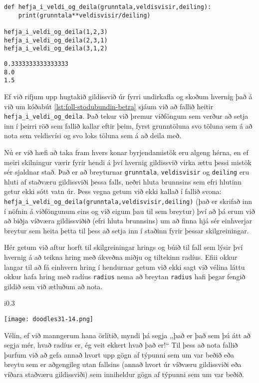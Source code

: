 \begin{lstlisting}[caption=Stöðubundin viðföng með skýrari breytuheitum, label=lst:foll-stodubundin-betra]
def hefja_i_veldi_og_deila(grunntala,veldisvisir,deiling):	
	print(grunntala**veldisvisir/deiling)

hefja_i_veldi_og_deila(1,2,3)
hefja_i_veldi_og_deila(2,3,1)
hefja_i_veldi_og_deila(3,1,2)
\end{lstlisting}
\lstset{style=uttak}
\begin{lstlisting}
0.3333333333333333
8.0
1.5
\end{lstlisting}
\lstset{style=venjulegt}

Ef við rifjum upp hugtakið gildissvið úr fyrri undirkafla og skoðum hvernig það á við um kóðabút \ref{lst:foll-stodubundin-betra} sjáum við að fallið heitir \texttt{hefja\_i\_veldi\_og\_deila}.
Það tekur við þremur viðföngum sem verður að setja inn í þeirri röð sem fallið kallar eftir þeim, fyrst grunntöluna svo töluna sem á að nota sem veldisvísi og svo loks töluna sem á að deila með.

Nú er við hæfi að taka fram hvers konar byrjendamistök eru algeng hérna, en ef meiri skilningur værir fyrir hendi á því hvernig gildissvið virka ættu þessi mistök sér sjaldnar stað.
Það er að breyturnar \texttt{grunntala}, \texttt{veldisvisir} og \texttt{deiling} eru hluti af staðværu gildissviði þessa falls, neðri hluta brunnsins sem efri hlutinn getur ekki sótt vatn úr.
Þess vegna getum við ekki kallað í fallið svona: \texttt{hefja\_i\_veldi\_og\_deila(grunntala,veldisvisir,deiling)} (það er skrifað inn í nöfnin á viðföngunum eins og við eigum þau til sem breytur) því að þá erum við að biðja víðværa gildissviðið (efri hluta brunnsins) um að finna hjá sér einhverjar breytur sem heita þetta til þess að setja inn í staðinn fyrir þessar skilgreiningar.

Hér getum við aftur horft til skilgreiningar hrings og búið til fall sem lýsir því hvernig á að teikna hring með ákveðna miðju og tiltekinn radíus.
Efiii  okkur langar til að fá einhvern hring í hendurnar getum við ekki sagt við vélina láttu okkur hafa hring með radíus \texttt{radius} nema að breytan \texttt{radius} hafi þegar fengið gildið sem við ætluðum að nota.

\begin{wrapfigure}{i}{0.3\textwidth} %
	\begin{center}
		\texttt{[image: doodles31-14.png]}
	\end{center}
\end{wrapfigure}
Vélin, ef við manngerum hana örlítið, myndi þá segja ,,það er það sem þú átt að segja mér, hvað radíus er, ég veit ekkert hvað það er!“
Til þess að nota fallið þurfum við að gefa annað hvort upp gögn af týpunni sem um var beðið eða breytu sem er aðgengileg utan fallsins (annað hvort úr víðværu gildissviði eða víðara staðværu gildissviði) sem inniheldur gögn af týpunni sem um var beðið.

